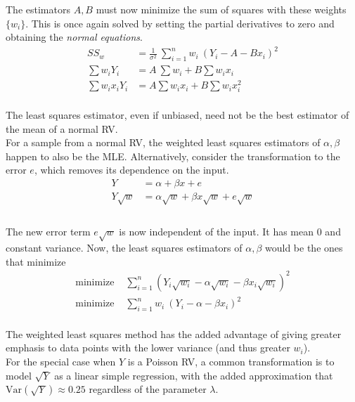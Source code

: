 The estimators $ A,B$ must now minimize the sum of squares with these weights $ \{w_i\} $. This is once again solved by setting the partial derivatives to zero and obtaining the \textit{normal equations}. \\

\begin{align}
	SS_w &= \frac{1}{\sigma^2}\ \sum\limits_{i = 1}^{n} w_i\ (Y_i - A - Bx_i)^2 \\
	\sum w_i Y_i & = A\ \sum w_i +B \sum w_i x_i\\
	\sum w_i x_i Y_i & = A \sum w_i x_i +B \sum w_i x_i^2
\end{align}\\

The least squares estimator, even if unbiased, need not be the best estimator of the mean of a normal RV.\\

For a sample from a normal RV, the weighted least squares estimators of $ \alpha, \beta $ happen to also be the MLE. Alternatively, consider the transformation to the error $ e $, which removes its dependence on the input.\\

\begin{align}
	Y &= \alpha + \beta x + e \nonumber \\
	Y \sqrt{w} &= \alpha \sqrt{w} + \beta x \sqrt{w} + e \sqrt{w}\nonumber \\
\end{align}\\

The new error term $ e \sqrt{w} $ is now independent of the input. It has mean $ 0 $ and constant variance. Now, the least squares estimators of $ \alpha, \beta $ would be the ones that minimize\\

\begin{align}
	\text{minimize } &\sum\limits_{i = 1}^{n} (Y_i \sqrt{w_i} - \alpha \sqrt{w_i} - \beta x_i \sqrt{w_i})^2 \nonumber \\
	\text{minimize } &\sum\limits_{i = 1}^{n} w_i\ (Y_i - \alpha - \beta x_i )^2 \nonumber
\end{align}\\

The weighted least squares method has the added advantage of giving greater emphasis to data points with the lower variance (and thus greater $ w_i $).\\

For the special case when $ Y $ is a Poisson RV, a common transformation is to model $ \sqrt{Y} $ as a linear simple regression, with the added approximation that $ \mathrm{Var}(\sqrt{Y}) \approx 0.25 $ regardless of the parameter $ \lambda $.\\

